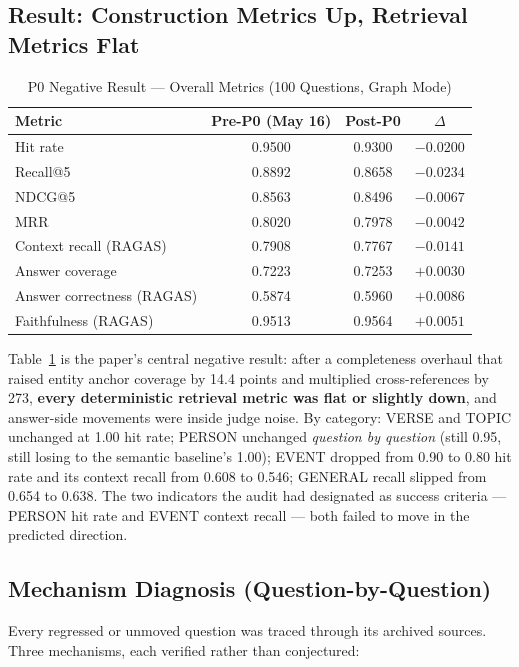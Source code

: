\subsection{Result: Construction Metrics Up, Retrieval Metrics Flat}

\begin{table}[!t]
\caption{P0 Negative Result --- Overall Metrics (100 Questions, Graph
Mode)}
\label{tab:p0result}
\centering
\begin{tabular}{@{}lccc@{}}
\toprule
Metric & Pre-P0 (May 16) & Post-P0 & $\Delta$ \\
\midrule
Hit rate        & 0.9500 & 0.9300 & $-0.0200$ \\
Recall@5        & 0.8892 & 0.8658 & $-0.0234$ \\
NDCG@5          & 0.8563 & 0.8496 & $-0.0067$ \\
MRR             & 0.8020 & 0.7978 & $-0.0042$ \\
Context recall (RAGAS) & 0.7908 & 0.7767 & $-0.0141$ \\
Answer coverage & 0.7223 & 0.7253 & $+0.0030$ \\
Answer correctness (RAGAS) & 0.5874 & 0.5960 & $+0.0086$ \\
Faithfulness (RAGAS) & 0.9513 & 0.9564 & $+0.0051$ \\
\bottomrule
\end{tabular}
\end{table}

Table~\ref{tab:p0result} is the paper's central negative result: after a
completeness overhaul that raised entity anchor coverage by 14.4 points and
multiplied cross-references by 273, \textbf{every deterministic
retrieval metric was flat or slightly down}, and answer-side movements
were inside judge noise. By category: VERSE and TOPIC unchanged at 1.00
hit rate; PERSON unchanged \emph{question by question} (still 0.95,
still losing to the semantic baseline's 1.00); EVENT dropped from 0.90
to 0.80 hit rate and its context recall from 0.608 to 0.546; GENERAL
recall slipped from 0.654 to 0.638. The two indicators the audit had
designated as success criteria --- PERSON hit rate and EVENT context
recall --- both failed to move in the predicted direction.

\subsection{Mechanism Diagnosis (Question-by-Question)}
\label{sec:diagnosis}

Every regressed or unmoved question was traced through its archived
sources. Three mechanisms, each verified rather than conjectured:

